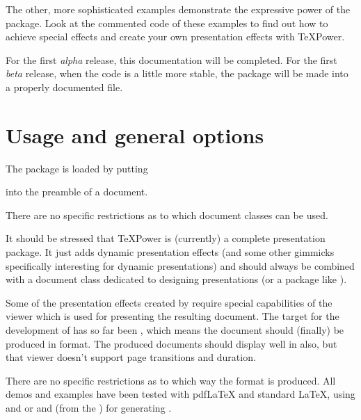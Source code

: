 \documentclass[12pt]{scrartcl}
\let\newslide=\relax
\begin{document}
\newslide

The other, more sophisticated examples demonstrate the expressive power of the
 package. Look at the commented code of these examples to find out how to achieve special effects and
create your own presentation effects with \TeX Power.

For the first \emph{alpha} release, this documentation will be completed. For the first \emph{beta} release, when the
code is a little more stable, the  package will be made into a properly documented  file.

\newslide

%
\section{Usage and general options}
The  package is loaded by putting
\begin{center}
\end{center}
into the preamble of a document.

There are no specific restrictions as to which document classes can be used.

It should be stressed that \TeX Power is  (currently) a complete presentation package. It just adds dynamic
presentation effects (and some other gimmicks specifically interesting for dynamic presentations) and should always be
combined with a document class dedicated to designing presentations (or a package like
\href{ftp://ftp.dante.de/tex-archive/help/Catalogue/entries/pdfslide.html}{}).

Some of the presentation effects created by  require special capabilities of the viewer which is used for
presenting the resulting document. The target for the development of  has so far been
\href{http://www.adobe.com/products/acrobat/readermain.html}%
{}, which means the
document should (finally) be produced in  format. The produced
 documents should display well in
\href{http://www.cs.wisc.edu/~ghost/gsview/}{} also, but that
viewer doesn't support page transitions and duration.

There are no specific restrictions as to which way the  format is produced. All demos and examples
have been tested with pdf\LaTeX{} and standard \LaTeX, using
 and \href{http://www.adobe.com/products/acrobat/}%
{}
or  and  (from the \href{http://www.ghostscript.com/}%
{}) for generating .
\end{document}
